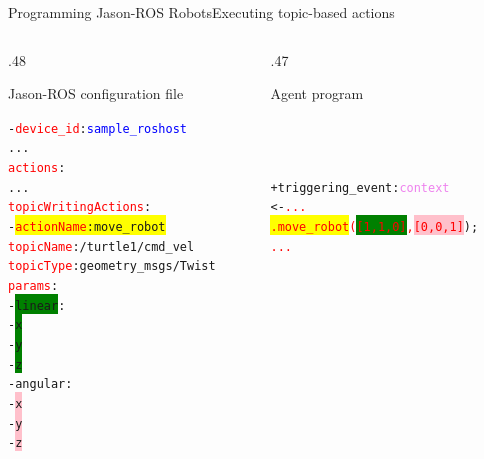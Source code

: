 \documentclass[compress]{beamer}
\newcommand{\yamlkey}[1]{\textcolor{red}{\texttt{#1}}}
\newcommand{\yamlvalue}[1]{\textcolor{blue}{\texttt{#1}}}
\newcommand{\planhead}[1]{\textcolor{indiagreen}{#1}}
\newcommand{\instruction}[1]{\textcolor{red}{#1}}
\newcommand{\belief}[1]{\textcolor{violet}{#1}}
\begin{document}
\begin{frame}[fragile]{Programming Jason-ROS Robots}{Executing topic-based actions}{}

\footnotesize



\begin{columns}

\begin{column}{.48\textwidth}

\begin{block}{{\ssmall Jason-ROS configuration file}}


\scriptsize
\begin{alltt}\ssmall
- \yamlkey{device_id}: \yamlvalue{sample_roshost}
     ...
  \yamlkey{actions}:        
        ...
     \yamlkey{topicWritingActions}:          
      - \colorbox{yellow}{\yamlkey{actionName}: move_robot}
        \yamlkey{topicName}: /turtle1/cmd_vel
        \yamlkey{topicType}: geometry_msgs/Twist 
        \yamlkey{params}:
           - \colorbox{green}{linear}:
              - \colorbox{green}{x}
              - \colorbox{green}{y}
              - \colorbox{green}{z}
           - angular:
              - \colorbox{pink}{x}
              - \colorbox{pink}{y}
              - \colorbox{pink}{z}  
\end{alltt}
    
\end{block}  
\end{column}

\hspace{-20pt} %

\begin{column}{.47\textwidth}

\begin{block}{{\ssmall Agent program}}

\begin{alltt}\ssmall
 
   
       \ \\
       \ \\
       \ \\

 +\planhead{triggering\_event} : \belief{context}
    <- \instruction{...}
       \instruction{\colorbox{yellow}{.move_robot}(\colorbox{green}{[1,1,0]}, \colorbox{pink}{[0,0,1]}});
       \instruction{...}
       \ \\
       \ \\
      
       
       

\end{alltt}
\end{block}
\end{column}
\end{columns}
\end{frame}
\end{document}
